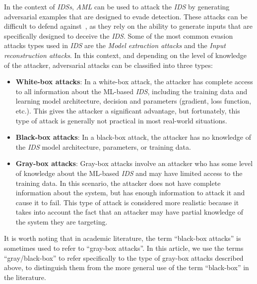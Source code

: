 In the context of \textit{IDSs}, \textit{AML} can be used to attack the \textit{IDS} by generating adversarial examples
that are designed to evade detection.
These attacks can be difficult to defend against~\cite{kariyappa2020defending}, as they rely on the ability to generate
inputs that are specifically designed to deceive the \textit{IDS}.
Some of the most common evasion attacks types used in \textit{IDS} are the \textit{Model extraction attacks} and the
\textit{Input reconstruction attacks}.
In this context, and depending on the level of knowledge of the attacker, adversarial attacks can be classified into
three types:

\begin{itemize}
    \item \textbf{White-box attacks}: In a white-box attack, the attacker has complete access to all information about
    the ML-based \textit{IDS}, including the training data and learning model architecture, decision and parameters
    (gradient, loss function, etc.).
    This gives the attacker a significant advantage, but fortunately, this type of attack is generally not practical
    in most real-world situations.

    \item \textbf{Black-box attacks}: In a black-box attack, the attacker has no knowledge of the \textit{IDS} model
    architecture, parameters, or training data.

    \item \textbf{Gray-box attacks}: Gray-box attacks involve an attacker who has some level of knowledge about the
    ML-based \textit{IDS} and may have limited access to the training data.
    In this scenario, the attacker does not have complete information about the system, but has enough information to
    attack it and cause it to fail.
    This type of attack is considered more realistic because it takes into account the fact that an attacker may
    have partial knowledge of the system they are targeting.
\end{itemize}

It is worth noting that in academic literature, the term ``black-box attacks'' is sometimes used to refer to
``gray-box attacks''.
In this article, we use the terms ``gray/black-box'' to refer specifically to the type of gray-box attacks
described above, to distinguish them from the more general use of the term ``black-box'' in the literature.
